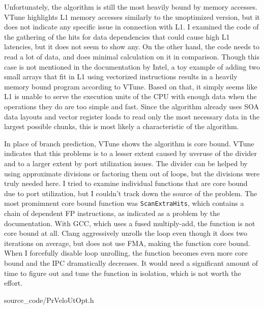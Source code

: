 \documentclass[12pt]{article}
\newcommand{\code}[1]{\texttt{#1}}
\begin{document}
Unfortunately, the algorithm is still the most heavily bound by memory accesses. VTune highlights L1 memory accesses similarly to the unoptimized version, but it does not indicate any specific issue in connection with L1. I examined the code of the gathering of the hits for data dependencies that could cause high L1 latencies, but it does not seem to show any. On the other hand, the code needs to read a lot of data, and does minimal calculation on it in comparison. Though this case is not mentioned in the documentation by Intel, a toy example of adding two small arrays that fit in L1 using vectorized instructions results in a heavily memory bound program according to VTune. Based on that, it simply seems like L1 is unable to serve the execution units of the CPU with enough data when the operations they do are too simple and fast. Since the algorithm already uses SOA data layouts and vector register loads to read only the most necessary data in the largest possible chunks, this is most likely a characteristic of the algorithm.

\vspace{1pc}

In place of branch prediction, VTune shows the algorithm is core bound. VTune indicates that this problems is to a lesser extent caused by uveruse of the divider and to a larger extent by port utilization issues. The divider can be helped by using approximate divisions or factoring them out of loops, but the divisions were truly needed here. I tried to examine individual functions that are core bound due to port utilization, but I couldn't track down the source of the problem. The most promimnent core bound function was \code{ScanExtraHits}, which contains a chain of dependent FP instructions, as indicated as a problem by the documentation\cite{intel_vtune_docs}. With GCC, which uses a fused multiply-add, the function is not core bound at all. Clang aggressively unrolls the loop even though it does two iterations on average, but does not use FMA, making the function core bound. When I forcefully disable loop unrolling, the function becomes even more core bound and the IPC dramatically decreases. It would need a significant amount of time to figure out and tune the function in isolation, which is not worth the effort.


	{source_code/PrVeloUtOpt.h}
\end{document}
